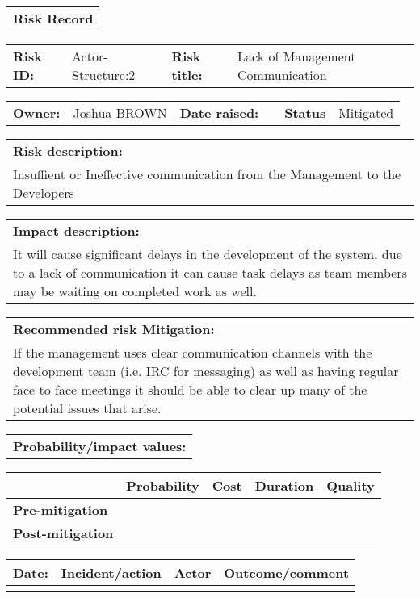 \begin{table}
	\begin{tabularx}{\textwidth}{| X |}
		\hline
		\textbf{Risk Record} \\
	\end{tabularx}
	\begin{tabularx}{\textwidth}{| l | X | l | X |}
		\hline
		\textbf{Risk ID:} & Actor-Structure:2 & \textbf{Risk title:} & Lack of Management Communication  \\
	\end{tabularx}
	\begin{tabularx}{\textwidth}{| l | X | l | X | l | X |}
		\hline
		\textbf{Owner:} & Joshua BROWN & \textbf{Date raised:} &  & \textbf{Status} & Mitigated \\
	\end{tabularx}
	\begin{tabularx}{\textwidth}{| X |}
		\hline
		\textbf{Risk description:} \\ Insuffient or Ineffective communication from the Management to the Developers  \\
	\end{tabularx}
	\begin{tabularx}{\textwidth}{| X |}
		\hline
		\textbf{Impact description:} \\ It will cause significant delays in the development of the system, due to a lack of communication it can cause task delays as team members may be waiting on completed work as well. \\
	\end{tabularx}
	\begin{tabularx}{\textwidth}{| X |}
		\hline
		\textbf{Recommended risk Mitigation:} \\ If the management uses clear communication channels with the development team (i.e. IRC for messaging) as well as having regular face to face meetings it should be able to clear up many of the potential issues that arise.  \\
	\end{tabularx}
	\begin{tabularx}{\textwidth}{| X |}
		\hline
		\textbf{Probability/impact values:} \\
	\end{tabularx}
	\begin{tabularx}{\textwidth}{| l | l | X | X | X |}
		\hline
		 &  \textbf{Probability} & \textbf{Cost} & \textbf{Duration} & \textbf{Quality} \\ \hline
		\textbf{Pre-mitigation} & & & & \\ \hline
		\textbf{Post-mitigation} & & & & \\ \hline \hline
	\end{tabularx}
	\begin{tabularx}{\textwidth}{| l | X | l | X |}
		\hline
		\textbf{Date:} & \textbf{Incident/action} & \textbf{Actor} & \textbf{Outcome/comment} \\ \hline
		 & &  &  \\ \hline
	\end{tabularx}%
\end{table}

